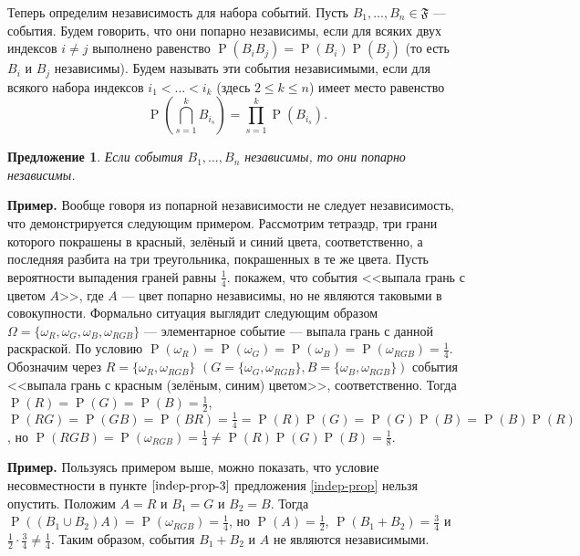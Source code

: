 \documentclass[12pt]{article}
\newtheorem{proposition}{Предложение}
\numberwithin{theorem}{section}
\numberwithin{proposition}{section}
\theoremstyle{definition}
\newenvironment{example}{\indent \textbf{Пример.}}{\indent}
\newcommand{\prob}{\operatorname{P}}
\newcommand{\defin}[2]{\hypertarget{#2}{{\color{red} #1}}}
\newcommand{\events}{\mathfrak{F}}
\begin{document}
	Теперь определим независимость для набора событий.
	Пусть $ B_1, \ldots, B_n \in \events $ --- события.
	Будем говорить, что они \defin{попарно независимы}{pairwise-independent}, если для всяких двух индексов $ i \neq j $ выполнено равенство
	$ \prob(B_iB_j) = \prob(B_i)\prob(B_j) $ (то есть $ B_i $ и $ B_j $ независимы). 
	Будем называть эти события \defin{независимыми}{global-independent}, если для всякого набора индексов
	$ i_1 < \ldots < i_k $ (здесь $ 2 \leqslant k \leqslant n $) имеет место равенство
	$$ \prob\left(\bigcap\limits_{s = 1}^{k} B_{i_s}\right) = \prod_{s = 1}^{k} \prob(B_{i_s}). $$
	
	\begin{proposition}
		Если события $ B_1, \ldots, B_n $ независимы, то они попарно независимы.
	\end{proposition}
	
	\begin{example}
		Вообще говоря из попарной независимости не следует независимость, что демонстрируется следующим примером.
		Рассмотрим тетраэдр, три грани которого покрашены в красный, зелёный и синий цвета, соответственно,
		а последняя разбита на три треугольника, покрашенных в те же цвета. 
		Пусть вероятности выпадения граней равны $ \tfrac{1}{4} $. покажем, что события <<выпала грань с цветом $ A $>>,
		где $ A $ --- цвет попарно независимы, но не являются таковыми в совокупности. 
		Формально ситуация выглядит следующим образом $ \Omega = \{\omega_{R}, \omega_{G}, \omega_{B}, \omega_{RGB}\} $
		--- элементарное событие --- выпала грань с данной раскраской.
		По условию $ \prob(\omega_{R}) = \prob(\omega_{G}) = \prob(\omega_{B}) = \prob(\omega_{RGB}) = \tfrac{1}{4} $.
		Обозначим через $ R = \{\omega_R, \omega_{RGB}\} $  $ (G = \{\omega_G, \omega_{RGB}\}, B = \{\omega_B, \omega_{RGB}\}) $
		события <<выпала грань с красным (зелёным, синим) цветом>>, соответственно.
		Тогда $ \prob(R) = \prob(G) = \prob(B) = \tfrac{1}{2} $,
		$ \prob(RG) = \prob(GB) = \prob(BR) = \tfrac{1}{4} = \prob(R)\prob(G) = \prob(G)\prob(B) = \prob(B)\prob(R) $,
		но $ \prob(RGB) = \prob(\omega_{RGB}) = \tfrac{1}{4} \neq \prob(R)\prob(G)\prob(B) = \tfrac{1}{8} $.
	\end{example}

	\begin{example}
		Пользуясь примером выше, можно показать, что условие несовместности в пункте $ \ref{indep-prop-3} $ 
		предложения \ref{indep-prop} нельзя опустить.
		Положим $ A = R $ и $ B_1 = G $ и $ B_2 = B $. Тогда $ \prob((B_1 \cup B_2)A) = \prob(\omega_{RGB}) = \tfrac{1}{4} $,
		но $ \prob(A) = \tfrac{1}{2} $, $ \prob(B_1 + B_2) = \tfrac{3}{4} $ и $ \tfrac{1}{2} \cdot \tfrac{3}{4} \neq \tfrac{1}{4} $.
		Таким образом, события $ B_1 + B_2 $ и $ A $ не являются независимыми.
	\end{example}
\end{document}
